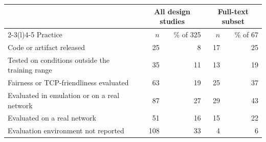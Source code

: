 \begin{tabular}{@{}lrrrr@{}}
\toprule
 & \multicolumn{2}{c}{All design studies} & \multicolumn{2}{c}{Full-text subset} \\
\cmidrule(lr){2-3}\cmidrule(l){4-5}
Practice & $n$ & \% of 325 & $n$ & \% of 67 \\
\midrule
Code or artifact released & 25 & 8 & 17 & 25 \\
Tested on conditions outside the training range & 35 & 11 & 13 & 19 \\
Fairness or TCP-friendliness evaluated & 63 & 19 & 25 & 37 \\
Evaluated in emulation or on a real network & 87 & 27 & 29 & 43 \\
Evaluated on a real network & 51 & 16 & 15 & 22 \\
Evaluation environment not reported & 108 & 33 & 4 & 6 \\
\bottomrule
\end{tabular}

